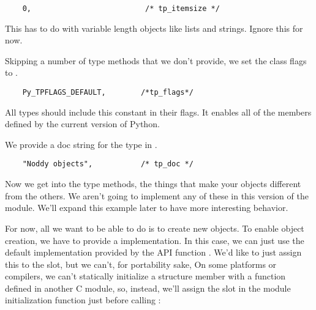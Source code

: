
\begin{verbatim}
    0,                          /* tp_itemsize */
\end{verbatim}

This has to do with variable length objects like lists and strings.
Ignore this for now.

Skipping a number of type methods that we don't provide, we set the
class flags to .

\begin{verbatim}
    Py_TPFLAGS_DEFAULT,        /*tp_flags*/
\end{verbatim}

All types should include this constant in their flags.  It enables all
of the members defined by the current version of Python.

We provide a doc string for the type in .

\begin{verbatim}
    "Noddy objects",           /* tp_doc */
\end{verbatim}

Now we get into the type methods, the things that make your objects
different from the others.  We aren't going to implement any of these
in this version of the module.  We'll expand this example later to
have more interesting behavior.

For now, all we want to be able to do is to create new 
objects. To enable object creation, we have to provide a
 implementation. In this case, we can just use the
default implementation provided by the API function
.  We'd like to just assign this to the
 slot, but we can't, for portability sake, On some
platforms or compilers, we can't statically initialize a structure
member with a function defined in another C module, so, instead, we'll
assign the  slot in the module initialization function
just before calling :

